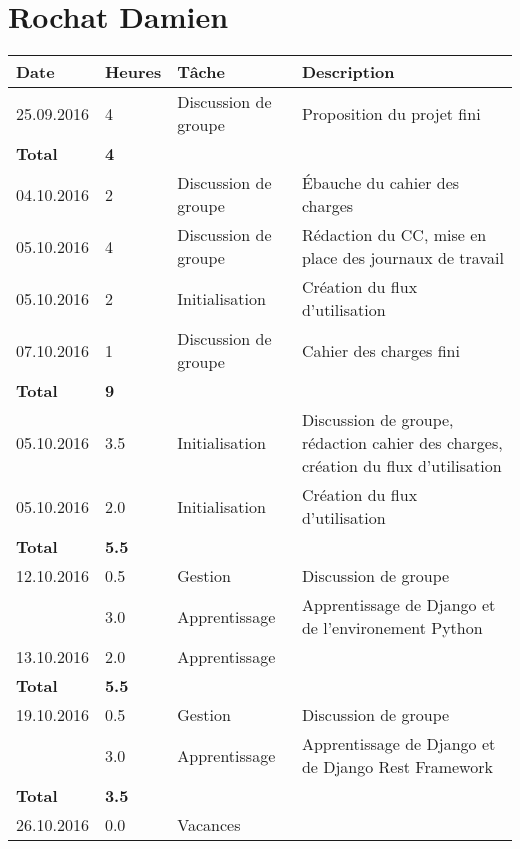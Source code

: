 \documentclass[french]{article}
\begin{document}
	\section*{Rochat Damien}
	\begin{longtable}{p{}|p{}|p{}|p{}}
		Date & Heures & Tâche & Description \\
		\hline
		
		\hline
		25.09.2016 & 4 & Discussion de groupe & Proposition du projet fini\\
		\textbf{Total} & \textbf{4} &&\\
		\hline
		04.10.2016 & 2 & Discussion de groupe & Ébauche du cahier des charges\\
		05.10.2016 & 4 & Discussion de groupe & Rédaction du CC, mise en place des journaux de travail\\
		05.10.2016 & 2 & Initialisation & Création du flux d'utilisation \\
		07.10.2016 & 1 & Discussion de groupe & Cahier des charges fini\\
		\textbf{Total} & \textbf{9} &&\\
		\hline
		
		\hline
		05.10.2016 & 3.5 & Initialisation & Discussion de groupe, rédaction cahier des charges, création du flux d'utilisation \\
		05.10.2016 & 2.0 & Initialisation & Création du flux d'utilisation \\
		\textbf{Total} & \textbf{5.5} && \\
		
		\hline
		12.10.2016 & 0.5 & Gestion & Discussion de groupe \\
			       & 3.0 & Apprentissage & Apprentissage de Django et de l'environement Python \\
		13.10.2016 & 2.0 & \multicolumn{2}{l}{Apprentissage} \\
		\textbf{Total} & \textbf{5.5} && \\
		
		\hline
		19.10.2016 & 0.5 & Gestion & Discussion de groupe \\
				   & 3.0 & Apprentissage & Apprentissage de Django et de Django Rest Framework \\
		\textbf{Total} & \textbf{3.5} && \\
		
		\hline
		26.10.2016 & 0.0 & \multicolumn{2}{l}{Vacances} \\
		

\end{longtable}
\end{document}
